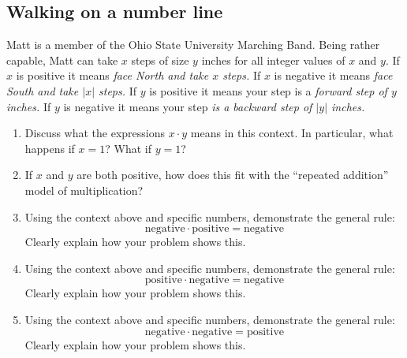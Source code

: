 \subsection*{Walking on a number line}
\begin{prob} 
Matt is a member of the Ohio State University
  Marching Band. Being rather capable, Matt can take $x$ steps of size
  $y$ inches for all integer values of $x$ and $y$.  If $x$ is
  positive it means \textit{face North and take $x$ steps.} If $x$ is
  negative it means \textit{face South and take $|x|$ steps.} If $y$
  is positive it means your step is a \textit{forward step of $y$
    inches.} If $y$ is negative it means your step \textit{is a
    backward step of $|y|$ inches.}
\begin{enumerate}
\item Discuss what the expressions $x \cdot y$ means in this
  context. In particular, what happens if $x = 1$? What if $y=1$?
\item If $x$ and $y$ are both positive, how does this fit with the ``repeated addition'' model of multiplication?    
\item Using the context above and specific numbers, 
demonstrate the general rule:
\[
\text{negative}\cdot \text{positive} = \text{negative}
\]
Clearly explain how your problem shows this.
\item Using the context above and specific numbers, 
demonstrate the general rule:
\[
\text{positive}\cdot \text{negative} = \text{negative}
\]
Clearly explain how your problem shows this.\item Using the context above and specific numbers, 
demonstrate the general rule:
\[
\text{negative}\cdot \text{negative} = \text{positive}
\]
Clearly explain how your problem shows this.
\end{enumerate}
\end{prob}

